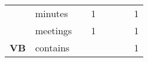 \documentclass[varwidth=true, border=10pt, convert={size=640x}]{standalone}
\begin{document}
{\begin{tabular}{clcccccc}
                     & minutes              &                                                                                         & 1                                                                      &                                                                   &                 &                & 1                  \\
                     & meetings             &                                                                                         & 1                                                                      &                                                                   &                 &                & 1                  \\ \hline
\textbf{VB} & contains             &                                                                                         &                                                                        &                                                                   &                 &                & 1                  \\ \hline
                     
\end{tabular}
}
\end{document}
